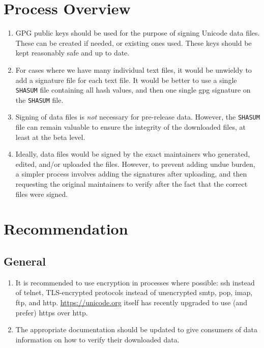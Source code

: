 \documentclass[12pt]{article}
\begin{document}
\section{Process Overview}

\begin{enumerate}

\item GPG public keys should be used for the purpose of signing Unicode data files. These can be created if needed, or existing ones used. These keys should be kept reasonably safe and up to date.

\item For cases where we have many individual text files, it would be unwieldy to add a signature file for each text file. It would be better to use a single {\tt SHASUM} file containing all hash values, and then one single gpg signature on the {\tt SHASUM} file.

\item Signing of data files is \emph{not} necessary for pre-release data. However, the {\tt SHASUM} file can remain valuable to ensure the integrity of the downloaded files, at least at the beta level.

\item Ideally, data files would be signed by the exact maintainers who generated, edited, and/or uploaded the files. However, to prevent adding undue burden, a simpler process involves adding the signatures after uploading, and then requesting the original maintainers to verify after the fact that the correct files were signed.

\end{enumerate}

\newpage
\section{Recommendation}

\subsection{General}

\begin{enumerate}

\item It is recommended to use encryption in processes where possible:   ssh instead of telnet,   TLS-encrypted protocols instead of unencrypted smtp, pop, imap, ftp, and http.    \url{https://unicode.org} itself has recently upgraded to use (and prefer) https over http.

\item The appropriate documentation should be updated to give consumers of data information on how to verify their downloaded data.

\end{enumerate}
\end{document}
